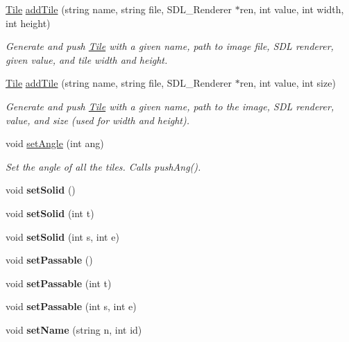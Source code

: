 \begin{DoxyCompactItemize}
\mbox{\label{classTileset_af8022d2b4129de86c132172ac8ce23a5}} 
\hyperlink{classTile}{Tile} \hyperlink{classTileset_af8022d2b4129de86c132172ac8ce23a5}{add\+Tile} (string name, string file, S\+D\+L\+\_\+\+Renderer $\ast$ren, int value, int width, int height)
\begin{DoxyCompactList}\small\item\em Generate and push \hyperlink{classTile}{Tile} with a given name, path to image file, S\+DL renderer, given value, and tile width and height. \end{DoxyCompactList}\item 
\mbox{\label{classTileset_adc54ffeda362f79668abb0bad2f73296}} 
\hyperlink{classTile}{Tile} \hyperlink{classTileset_adc54ffeda362f79668abb0bad2f73296}{add\+Tile} (string name, string file, S\+D\+L\+\_\+\+Renderer $\ast$ren, int value, int size)
\begin{DoxyCompactList}\small\item\em Generate and push \hyperlink{classTile}{Tile} with a given name, path to the image, S\+DL renderer, value, and size (used for width and height). \end{DoxyCompactList}\item 
\mbox{\label{classTileset_ab1dab8dd83a80e5d49dcdb95f9841898}} 
void \hyperlink{classTileset_ab1dab8dd83a80e5d49dcdb95f9841898}{set\+Angle} (int ang)
\begin{DoxyCompactList}\small\item\em Set the angle of all the tiles. Calls push\+Ang(). \end{DoxyCompactList}\item 
\mbox{\label{classTileset_a87978787ae2529b915c0436b5872dd48}} 
void {\bfseries set\+Solid} ()
\item 
\mbox{\label{classTileset_aa4dd63b2c6422ed5a9b7d772963fe255}} 
void {\bfseries set\+Solid} (int t)
\item 
\mbox{\label{classTileset_a6d40a14146a3dedd0217a412a66f4c9a}} 
void {\bfseries set\+Solid} (int s, int e)
\item 
\mbox{\label{classTileset_a9fc3756317f238121769629ea20a9849}} 
void {\bfseries set\+Passable} ()
\item 
\mbox{\label{classTileset_a231401092d65e28b7dea12e97e3232ad}} 
void {\bfseries set\+Passable} (int t)
\item 
\mbox{\label{classTileset_a84b12096b06c7162ca4bb9058a232d21}} 
void {\bfseries set\+Passable} (int s, int e)
\item 
\mbox{\label{classTileset_ad5f3a60a84cec25c6e11856a7cd36d84}} 
void {\bfseries set\+Name} (string n, int id)
\end{DoxyCompactItemize}


